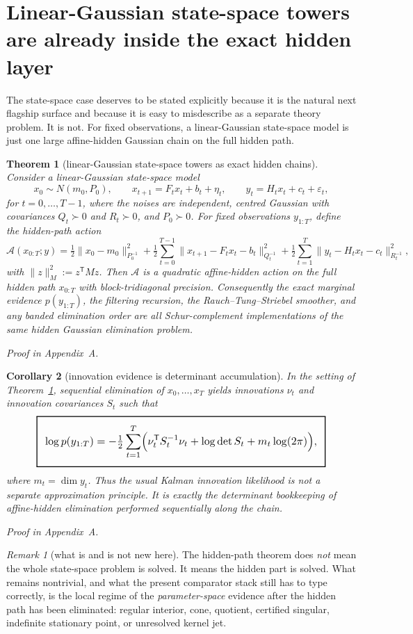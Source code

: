 \documentclass[11pt,a4paper]{article}
\numberwithin{equation}{section}
\newcommand{\geomboxed}[1]{%
  \setlength{\fboxsep}{8pt}%
  \setlength{\fboxrule}{0.9pt}%
  \fbox{\scalebox{1.12}{$\displaystyle #1$}}%
}
\theoremstyle{thmcompact}
\newtheorem{theorem}{Theorem}[section]
\newtheorem{corollary}[theorem]{Corollary}
\theoremstyle{remark}
\newtheorem*{remarkplain}{Remark}
\newenvironment{remark}[1][]%
{\begin{remarkbox}\begin{remarkplain}[#1]\normalfont}
{\end{remarkplain}\end{remarkbox}}
\newcommand{\proofappendix}{\par{\hfill\scriptsize\emph{Proof in Appendix~A.}}\par}
\begin{document}
\section{Linear-Gaussian state-space towers are already inside the exact hidden layer}

The state-space case deserves to be stated explicitly because it is the natural next flagship surface and because it is easy to misdescribe as a separate theory problem. It is not. For fixed observations, a linear-Gaussian state-space model is just one large affine-hidden Gaussian chain on the full hidden path.

\begin{theorem}[linear-Gaussian state-space towers as exact hidden chains]\label{thm:state-space-chain}
Consider a linear-Gaussian state-space model
\[
x_0\sim N(m_0,P_0),
\qquad
x_{t+1}=F_t x_t+b_t+\eta_t,
\qquad
y_t=H_t x_t+c_t+\varepsilon_t,
\]
for $t=0,\dots,T-1$, where the noises are independent, centred Gaussian with covariances $Q_t\succ0$ and $R_t\succ0$, and $P_0\succ0$. For fixed observations $y_{1:T}$, define the hidden-path action
\[
\mathcal A(x_{0:T};y)
=
\tfrac12\|x_0-m_0\|_{P_0^{-1}}^2
+
\tfrac12\sum_{t=0}^{T-1}\|x_{t+1}-F_t x_t-b_t\|_{Q_t^{-1}}^2
+
\tfrac12\sum_{t=1}^{T}\|y_t-H_t x_t-c_t\|_{R_t^{-1}}^2,
\]
with $\|z\|_M^2:=z^{\mathsf T}Mz$. Then $\mathcal A$ is a quadratic affine-hidden action on the full hidden path $x_{0:T}$ with block-tridiagonal precision. Consequently the exact marginal evidence $p(y_{1:T})$, the filtering recursion, the Rauch--Tung--Striebel smoother, and any banded elimination order are all Schur-complement implementations of the same hidden Gaussian elimination problem.
\proofappendix
\end{theorem}

\begin{corollary}[innovation evidence is determinant accumulation]\label{cor:innovation-acc}
In the setting of Theorem~\ref{thm:state-space-chain}, sequential elimination of $x_0,\dots,x_T$ yields innovations $\nu_t$ and innovation covariances $S_t$ such that
\[
\geomboxed{
\log p(y_{1:T})
=
-\tfrac12\sum_{t=1}^{T}
\Bigl(
\nu_t^{\mathsf T}S_t^{-1}\nu_t
+
\log\det S_t
+
 m_t\log(2\pi)
\Bigr),}
\]
where $m_t=\dim y_t$. Thus the usual Kalman innovation likelihood is not a separate approximation principle. It is exactly the determinant bookkeeping of affine-hidden elimination performed sequentially along the chain.
\proofappendix
\end{corollary}

\begin{remark}[what is and is not new here]
The hidden-path theorem does \emph{not} mean the whole state-space problem is solved. It means the hidden part is solved. What remains nontrivial, and what the present comparator stack still has to type correctly, is the local regime of the \emph{parameter-space} evidence after the hidden path has been eliminated: regular interior, cone, quotient, certified singular, indefinite stationary point, or unresolved kernel jet.
\end{remark}
\end{document}
